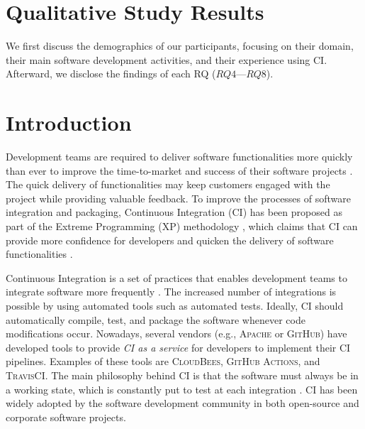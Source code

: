 \section{\textbf{Qualitative Study Results}}
\label{sec_qualitative_study_results}

We first discuss the demographics of our participants, focusing on their domain, their main software development activities, and their experience using CI. Afterward, we disclose the findings of each RQ ($RQ4$---$RQ8$).







\section{Introduction}

Development teams are required to deliver software functionalities more quickly than ever to
improve the time-to-market and success of their software projects \citep{Debbiche2014}. The quick delivery of functionalities may keep customers engaged with the project while providing valuable feedback. 
To improve the processes of software integration and packaging, Continuous Integration (CI) has been proposed as part of the Extreme Programming (XP) methodology \citep{Beck2000-ja}, which claims that CI can provide more confidence for developers and quicken the delivery of software functionalities \citep{Laukkanen2015-ab}. 

Continuous Integration is a set of practices that enables development teams to integrate software more frequently \citep{Fowler2006-zc}. The increased number of integrations is possible by using automated tools such as automated tests. Ideally, CI should automatically compile, test, and package the software whenever code modifications occur. Nowadays, several vendors (e.g., \textsc{Apache} or \textsc{GitHub}) have developed tools to provide {\em CI as a service} for developers to implement their CI pipelines. Examples of these tools are \textsc{CloudBees}, \textsc{GitHub Actions}, and \textsc{TravisCI}. The main philosophy behind CI is that the software must always be in a working state, which is constantly put to test at each integration \citep{Duvall2007-tb}. CI has been widely adopted by the software development community in both open-source and corporate software projects. 

